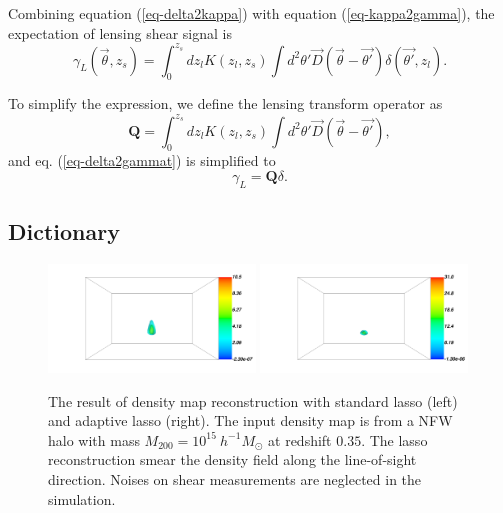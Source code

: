 \documentclass[twocolumn]{aastex62}
\begin{document}
Combining equation (\ref{eq-delta2kappa}) with equation (\ref{eq-kappa2gamma}), the expectation of lensing shear signal is 
\begin{equation}\label{eq-delta2gammat}
\gamma_L(\vec{\theta},z_s) = \int_0^{z_s} dz_l K(z_l,z_s) \int d^2 \theta' \vec{D}(\vec{\theta}-\vec{\theta'}) \delta(\vec{\theta'},z_l).
\end{equation}

To simplify the expression, we define the lensing transform operator as
\begin{equation}
\mathbf{Q}=\int_0^{z_s} dz_l K(z_l,z_s) \int d^2 \theta'  \vec{D}(\vec{\theta}-\vec{\theta'}),
\end{equation}
and eq. (\ref{eq-delta2gammat}) is simplified to
\begin{equation} \label{eq-delta2gammat-simp}
\gamma_L=\mathbf{Q}\delta.
\end{equation}

\subsection{Dictionary}
\label{subsec:method-dictionary}

\begin{figure}[!t]
\centering
\includegraphics[width=0.49\textwidth]{delta-3-7-pz-nn-lasso.pdf}
\includegraphics[width=0.49\textwidth]{delta-3-7-pz-nn-alasso.pdf}
\caption{The result of density map reconstruction with standard lasso (left) and adaptive lasso (right). The input density 
        map is from a NFW halo with mass $M_{200}=10^{15} ~h^{-1}M_{\odot}$ at redshift $0.35$. The lasso reconstruction 
        smear the density field along the line-of-sight direction. Noises on shear measurements are neglected in the 
        simulation.} \label{fig-lassoVsadaLasso}
\end{figure}
\end{document}
